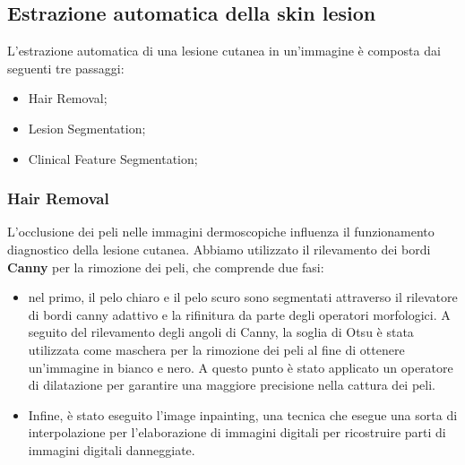 {\subsection{Estrazione automatica della skin lesion}
L'estrazione automatica di una lesione cutanea in un'immagine è composta dai seguenti tre passaggi:
\begin{itemize}
	\item Hair Removal;
	\item Lesion Segmentation;
	\item Clinical Feature Segmentation;
\end{itemize}
\subsubsection{Hair Removal}
L'occlusione dei peli nelle immagini dermoscopiche influenza il funzionamento diagnostico della lesione cutanea.
Abbiamo utilizzato il rilevamento dei bordi \textbf{Canny} per la rimozione dei peli, che comprende due fasi:
\begin{itemize}
	\item nel primo, il pelo chiaro e il pelo scuro sono segmentati attraverso il rilevatore di bordi canny adattivo e la rifinitura da parte degli operatori morfologici.
	A seguito del rilevamento degli angoli di Canny, la soglia di Otsu è stata utilizzata come maschera per la rimozione dei peli al fine di ottenere un'immagine in bianco e nero. A questo punto è stato applicato un operatore di dilatazione per garantire una maggiore precisione nella cattura dei peli.
	\item Infine, è stato eseguito l'image inpainting, una tecnica che esegue una sorta di interpolazione per l'elaborazione di immagini digitali per ricostruire parti di immagini digitali danneggiate.
\end{itemize} 
}
